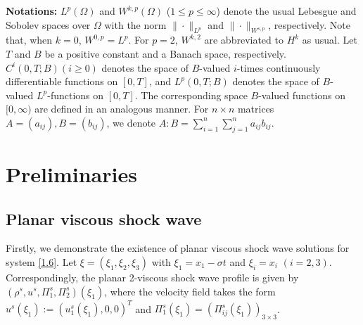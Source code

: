 \documentclass[10pt,reqno]{amsart}
\numberwithin{equation}{section}
\begin{document}
\textbf{Notations:}  $L^p(\Omega)$ and $W^{k,p}(\Omega)$  ($1\le p \le\infty$) denote the usual Lebesgue and Sobolev spaces over $\Omega$ with the norm $\|\cdot \|_{L^p}$ and $\|\cdot\|_{W^{s,p}}$, respectively. Note that, when $k=0$, $W^{0,p}=L^p$. For $p=2$, $W^{k, 2}$ are abbreviated to $H^k$ as usual.
Let $T$ and $B$ be a positive constant and a Banach space, respectively. $C^i(0,T; B)(i \ge 0 )$ denotes the space of $B$-valued $i$-times continuously differentiable functions on $[0,T]$, and $L^p(0,T; B)$ denotes the space of $B$-valued $L^p$-functions on $[0,T]$. The corresponding space $B$-valued functions on $[0,\infty)$ are defined in an analogous manner. For $n\times n$ matrices $A=(a_{ij}), B=(b_{ij})$, we denote $A:B=\sum_{i=1}^{n}\sum_{j=1}^{n}a_{ij}b_{ij}$.

\section{Preliminaries}

\subsection{Planar viscous shock wave}

Firstly, we demonstrate the existence of planar viscous shock wave solutions for system \eqref{1.6}. Let $\xi=(\xi_1, \xi_2, \xi_3)$ with $\xi_1=x_1-\sigma t$ and $\xi_i=x_i$ $(i=2,3)$. Correspondingly, the planar 2-viscous shock wave profile is given by $(\rho^s, u^s, \Pi_1^s, \Pi_2^s)(\xi_1)$, where the velocity field takes the form $u^s(\xi_1):=(u_1^s(\xi_1), 0, 0)^T$ and $\Pi^s_1(\xi_1)=(\Pi^s_{ij}(\xi_1))_{3\times3}$.%
\end{document}
